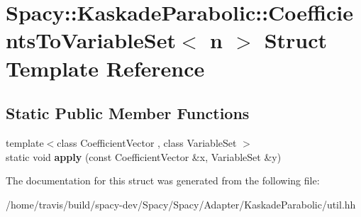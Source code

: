 \hypertarget{structSpacy_1_1KaskadeParabolic_1_1CoefficientsToVariableSet}{\section{Spacy\-:\-:Kaskade\-Parabolic\-:\-:Coefficients\-To\-Variable\-Set$<$ n $>$ Struct Template Reference}
\label{structSpacy_1_1KaskadeParabolic_1_1CoefficientsToVariableSet}
}
\subsection*{Static Public Member Functions}
\begin{DoxyCompactItemize}
\item 
\hypertarget{structSpacy_1_1KaskadeParabolic_1_1CoefficientsToVariableSet_a166b20e869f8e3ade88c78468b26c60e}{{\footnotesize template$<$class Coefficient\-Vector , class Variable\-Set $>$ }\\static void {\bfseries apply} (const Coefficient\-Vector \&x, Variable\-Set \&y)}\label{structSpacy_1_1KaskadeParabolic_1_1CoefficientsToVariableSet_a166b20e869f8e3ade88c78468b26c60e}

\end{DoxyCompactItemize}


The documentation for this struct was generated from the following file\-:\begin{DoxyCompactItemize}
\item 
/home/travis/build/spacy-\/dev/\-Spacy/\-Spacy/\-Adapter/\-Kaskade\-Parabolic/util.\-hh\end{DoxyCompactItemize}

